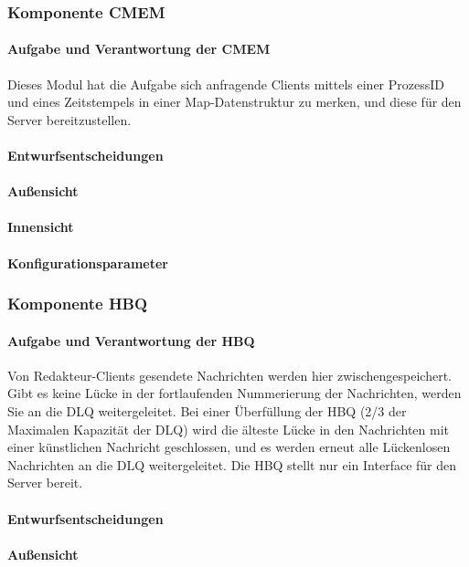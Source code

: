 \documentclass{article}
\begin{document}
		\subsubsection{Komponente CMEM}
			\paragraph{Aufgabe und Verantwortung der CMEM}
				Dieses Modul hat die Aufgabe sich anfragende Clients mittels einer ProzessID und eines Zeitstempels in einer Map-Datenstruktur zu merken, und diese für den Server bereitzustellen.
			\paragraph{Entwurfsentscheidungen}
			\paragraph{Außensicht}
			\paragraph{Innensicht}
			\paragraph{Konfigurationsparameter}
			
			
		\subsubsection{Komponente HBQ}
			\paragraph{Aufgabe und Verantwortung der HBQ}
				Von Redakteur-Clients gesendete Nachrichten werden hier zwischengespeichert. Gibt es keine Lücke in der fortlaufenden Nummerierung der Nachrichten, werden Sie an die DLQ weitergeleitet. Bei einer Überfüllung der HBQ (2/3 der Maximalen Kapazität der DLQ) wird die älteste Lücke in den Nachrichten mit einer künstlichen Nachricht geschlossen, und es werden erneut alle Lückenlosen Nachrichten an die DLQ weitergeleitet. Die HBQ stellt nur ein Interface für den Server bereit.
			\paragraph{Entwurfsentscheidungen}
			\paragraph{Außensicht}
\end{document}
